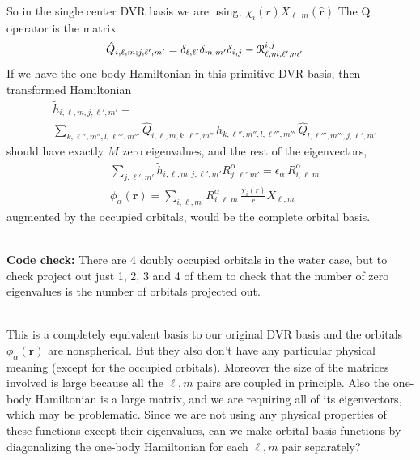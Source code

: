 \documentclass[%
pra%
,twocolumn%
,amssymb, nobibnotes, aps,
longbibliography
]{revtex4-1}
\begin{document}
So in the single center DVR basis we are using, $\chi_i(r) X_{\ell,m} (\mathbf{\hat{r}})$ The Q operator is the matrix
\begin{equation}
\begin{split}
\hat{Q}_{i,\ell,m ;  j, \ell',m'} 
&= \delta_{\ell,\ell'} \delta_{m,m'} \delta_{i,j}  - \EuScript{R}_{\ell,m,\ell',m'}^{i,j} 
\end{split}
\end{equation}
If we have the one-body Hamiltonian in this primitive DVR basis, then transformed Hamiltonian
\begin{equation}
\begin{split}
& \tilde{h}_{i,\ell,m, j, \ell',m'} = \\
& \sum_{ k, \ell'',m'', l,\ell''',m'''} \hat{Q}_{i,\ell,m, k, \ell'',m''}\, h_{k,\ell'',m'', l, \ell''',m'''} \,\hat{Q}_{l,\ell''',m''', j, \ell',m'} 
 \end{split}
\end{equation}
should have exactly $M$ zero eigenvalues, and the rest of the eigenvectors, 
\begin{equation}
\begin{split}
& \sum_{j,\ell',m'}\tilde{h}_{i,\ell,m, j, \ell',m'} R^{\alpha}_{j,\ell'.m'} = \epsilon_\alpha \,R^{\alpha}_{i,\ell.m} \\
&\phi_\alpha(\mathbf{r}) = \sum_{i,\ell,m} \,R^{\alpha}_{i,\ell.m}\,  \frac{\chi_i(r)}{r} X_{\ell,m}
 \end{split}
\end{equation}
augmented by the occupied orbitals, would be the complete orbital basis.
\\
\

\noindent \textbf{Code check:} There are 4 doubly occupied orbitals in the water case, but to check project out just 1, 2, 3 and 4 of them to check that the number of zero eigenvalues is the number of orbitals projected out.
\\
\

This is a completely equivalent basis to our original DVR basis and the orbitals $\phi_\alpha(\mathbf{r})$ are nonspherical.  But they also don't have any particular physical meaning (except for the occupied orbitals).  Moreover the size of the matrices involved is large because all the $\ell,m$ pairs are coupled in principle.  Also the one-body Hamiltonian is a large matrix, and we are requiring all of its eigenvectors, which may be problematic.  Since we are not using any physical properties of these functions except their eigenvalues, can we make orbital basis functions by diagonalizing the one-body Hamiltonian  for each $\ell,m$ pair separately?
\end{document}
